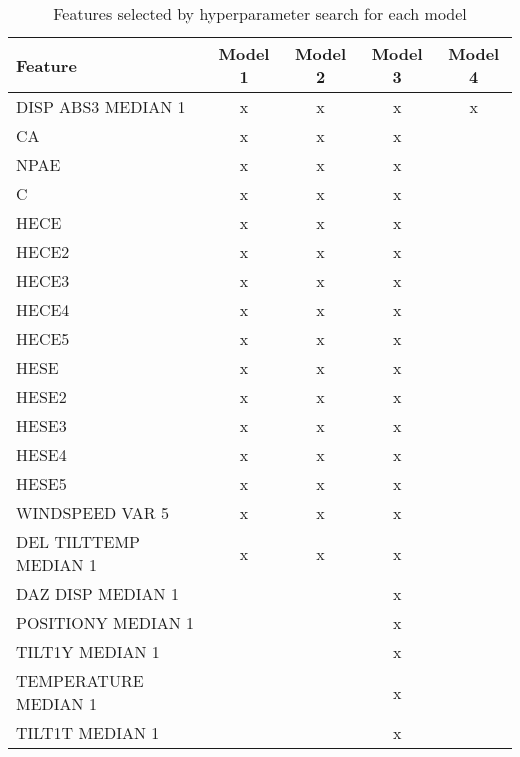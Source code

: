 
\begin{table}[htbp]
    \centering
    \caption{Features selected by hyperparameter search for each model}
    \label{tab:features}
    \begin{tabular}{|l|cccc|}
        \hline
        Feature & Model 1 & Model 2 & Model 3 & Model 4 \\ \hline
        DISP ABS3 MEDIAN 1 & x & x & x & x \\ \hline
        CA & x & x & x & \\ \hline
        NPAE & x & x & x & \\ \hline
        C & x & x & x & \\ \hline
        HECE & x & x & x & \\ \hline
        HECE2 & x & x & x & \\ \hline
        HECE3 & x & x & x & \\ \hline
        HECE4 & x & x & x & \\ \hline
        HECE5 & x & x & x & \\ \hline
        HESE & x & x & x & \\ \hline
        HESE2 & x & x & x & \\ \hline
        HESE3 & x & x & x & \\ \hline
        HESE4 & x & x & x & \\ \hline
        HESE5 & x & x & x & \\ \hline
        WINDSPEED VAR 5 & x & x & x & \\ \hline
        DEL TILTTEMP MEDIAN 1 & x & x & x & \\ \hline
        DAZ DISP MEDIAN 1 & & & x & \\ \hline
        POSITIONY MEDIAN 1 & & & x & \\ \hline
        TILT1Y MEDIAN 1 & & & x & \\ \hline
        TEMPERATURE MEDIAN 1 & & & x & \\ \hline
        TILT1T MEDIAN 1 & & & x & \\ \hline
    \end{tabular}
\end{table}